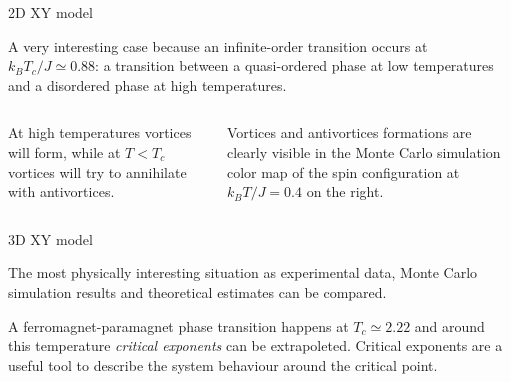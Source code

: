\documentclass{beamer}
\begin{document}
\begin{frame}{2D XY model}

A very interesting case because an infinite-order transition occurs at $k_B T_c /
J \simeq 0.88$: a transition between a quasi-ordered phase at low temperatures and
a disordered phase at high temperatures.

\begin{columns}

At high temperatures vortices will form, while at $T < T_c$ vortices will try to
annihilate with antivortices. 

Vortices and antivortices formations are clearly visible in the Monte Carlo
simulation color map of the spin configuration at $k_B T / J = 0.4$ on the right. 


\end{columns}
\end{frame}


\begin{frame}{3D XY model}

The most physically interesting situation as experimental data, Monte Carlo
simulation results and theoretical estimates can be compared.

\vspace{5mm}

A ferromagnet-paramagnet phase transition happens at $T_c \simeq 2.22$ and 
around this temperature \emph{critical exponents} can be extrapoleted. Critical
exponents are a useful tool to describe the system behaviour around the critical
point.

\end{frame}
\end{document}
